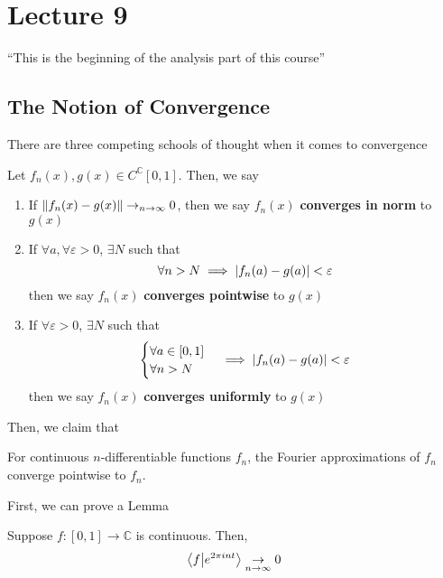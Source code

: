 \section{Lecture 9}
``This is the beginning of the analysis part of this course''
\subsection{The Notion of Convergence}
There are three competing schools of thought when it comes to convergence
\begin{definition}
    Let $f_n(x), g(x) \in C^\mathbb{C}[0,1]$. Then, we say
    \begin{enumerate}
        \item If $\norm{f_n(x) - g(x)} \to_{n\to\infty} 0$, then we say $f_n(x)$ \textbf{converges in norm} to $g(x)$
        \item If $\forall a, \forall \varepsilon > 0$, $\exists N$ such that
        $$\forall n > N \implies \abs{f_n(a) - g(a)} < \varepsilon$$
        then we say $f_n(x)$ \textbf{converges pointwise} to $g(x)$
        \item If $\forall \varepsilon > 0$, $\exists N$ such that
        \begin{align}
            \begin{cases}
                \forall a \in [0,1]\\
                \forall n > N
            \end{cases}
            \implies \abs{f_n(a) - g(a)} < \varepsilon
        \end{align}
        then we say $f_n(x)$ \textbf{converges uniformly} to $g(x)$
    \end{enumerate}
\end{definition}
Then, we claim that
\begin{proposition}
    For continuous $n$-differentiable functions $f_n$, the Fourier approximations of $f_n$ converge pointwise to $f_n$.
\end{proposition}
First, we can prove a Lemma
\begin{lemma}
    Suppose $f: [0,1] \to \mathbb{C}$ is continuous. Then,
    \begin{align}
        \braket{f}{e^{2\pi int}} \underset{n\to\infty}{\to} 0
    \end{align}
\end{lemma}
